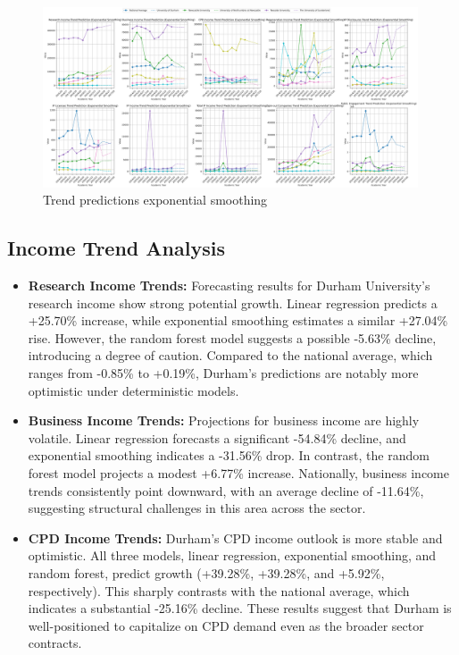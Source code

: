 \documentclass[journal,onecolumn, 10pt,draftclsnofoot]{IEEEtran}
\begin{document}
\begin{figure}[h]
\centering
\includegraphics[width=0.99\textwidth]{Fig/figure43.trend_predictions_exponential_smoothing.png}
\caption{Trend predictions exponential smoothing}
\label{fig:trend-predictions-exponential-smoothing}
\end{figure}

\subsection{Income Trend Analysis}

\begin{itemize}
    \item \textbf{Research Income Trends:} Forecasting results for Durham University's research income show strong potential growth. Linear regression predicts a +25.70\% increase, while exponential smoothing estimates a similar +27.04\% rise. However, the random forest model suggests a possible -5.63\% decline, introducing a degree of caution. Compared to the national average, which ranges from -0.85\% to +0.19\%, Durham's predictions are notably more optimistic under deterministic models.
    
    \item \textbf{Business Income Trends:} Projections for business income are highly volatile. Linear regression forecasts a significant -54.84\% decline, and exponential smoothing indicates a -31.56\% drop. In contrast, the random forest model projects a modest +6.77\% increase. Nationally, business income trends consistently point downward, with an average decline of -11.64\%, suggesting structural challenges in this area across the sector.
    
    \item \textbf{CPD Income Trends:} Durham's CPD income outlook is more stable and optimistic. All three models, linear regression, exponential smoothing, and random forest, predict growth (+39.28\%, +39.28\%, and +5.92\%, respectively). This sharply contrasts with the national average, which indicates a substantial -25.16\% decline. These results suggest that Durham is well-positioned to capitalize on CPD demand even as the broader sector contracts.
\end{itemize}
\end{document}
